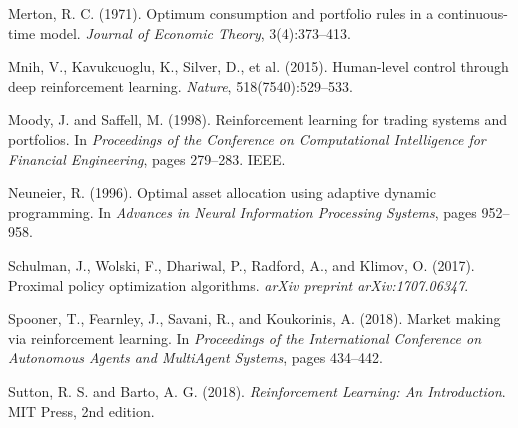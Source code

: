 \documentclass[12pt]{article}
\begin{document}
\begin{thebibliography}{99}
Merton, R. C. (1971).
\newblock Optimum consumption and portfolio rules in a continuous-time model.
\newblock \emph{Journal of Economic Theory}, 3(4):373--413.

Mnih, V., Kavukcuoglu, K., Silver, D., et al. (2015).
\newblock Human-level control through deep reinforcement learning.
\newblock \emph{Nature}, 518(7540):529--533.

Moody, J. and Saffell, M. (1998).
\newblock Reinforcement learning for trading systems and portfolios.
\newblock In \emph{Proceedings of the Conference on Computational Intelligence for Financial Engineering}, pages 279--283. IEEE.

Neuneier, R. (1996).
\newblock Optimal asset allocation using adaptive dynamic programming.
\newblock In \emph{Advances in Neural Information Processing Systems}, pages 952--958.

Schulman, J., Wolski, F., Dhariwal, P., Radford, A., and Klimov, O. (2017).
\newblock Proximal policy optimization algorithms.
\newblock \emph{arXiv preprint arXiv:1707.06347}.

Spooner, T., Fearnley, J., Savani, R., and Koukorinis, A. (2018).
\newblock Market making via reinforcement learning.
\newblock In \emph{Proceedings of the International Conference on Autonomous Agents and MultiAgent Systems}, pages 434--442.

Sutton, R. S. and Barto, A. G. (2018).
\newblock \emph{Reinforcement Learning: An Introduction}.
\newblock MIT Press, 2nd edition.

\end{thebibliography}
\end{document}
